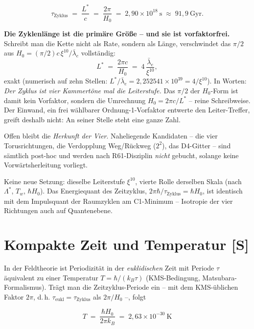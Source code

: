 \documentclass[11pt]{report}
\begin{document}
\begin{equation}
  \tau_\text{Zyklus} \;=\; \frac{L^{*}}{c}
  \;=\; \frac{2\pi}{H_0}
  \;=\; 2{,}90\times10^{18}~\text{s}
  \;\approx\; 91{,}9~\text{Gyr}.
  \label{eq:tauzyk}
\end{equation}

\textbf{Die Zyklenlänge ist die primäre Größe -- und sie ist
vorfaktorfrei.} Schreibt man die Kette nicht als Rate, sondern als
Länge, verschwindet das $\pi/2$ aus $H_0 = (\pi/2)c\,\xi^{10}/
\bar\lambda_e$ vollständig:
\begin{equation}
  L^{*} \;=\; \frac{2\pi c}{H_0}
  \;=\; 4\,\frac{\bar\lambda_e}{\xi^{10}},
  \label{eq:Lstar4}
\end{equation}
exakt (numerisch auf zehn Stellen: $L^{*}/\bar\lambda_e =
2{,}252541\times10^{39} = 4/\xi^{10}$). In Worten: \emph{Der Zyklus
ist vier Kammertöne mal die Leiterstufe.} Das $\pi/2$ der
$H_0$-Form ist damit kein Vorfaktor, sondern die Umrechnung
$H_0 = 2\pi c/L^{*}$ -- reine Schreibweise. Der Einwand, ein frei
wählbarer Ordnung-1-Vorfaktor entwerte den Leiter-Treffer, greift
deshalb nicht: An seiner Stelle steht eine ganze Zahl.

Offen bleibt die \emph{Herkunft der Vier}. Naheliegende
Kandidaten -- die vier Torusrichtungen, die Verdopplung
Weg/Rückweg ($2^2$), das D4-Gitter -- sind sämtlich post-hoc und
werden nach R61-Disziplin \emph{nicht} gebucht, solange keine
Vorwärtsherleitung vorliegt.

Keine neue Setzung: dieselbe Leiterstufe $\xi^{10}$, vierte Rolle
derselben Skala (nach $\Lambda^{*}$, $T_w$, $\hbar H_0$). Das
Energiequant des Zeitzyklus, $2\pi\hbar/\tau_\text{Zyklus}
= \hbar H_0$, ist identisch mit dem Impulsquant der Raumzyklen am
C1-Minimum -- Isotropie der vier Richtungen auch auf Quantenebene.

\section{Kompakte Zeit und Temperatur [S]}

In der Feldtheorie ist Periodizität in der \emph{euklidischen} Zeit
mit Periode $\tau$ äquivalent zu einer Temperatur
$T = \hbar/(k_B\tau)$ (KMS-Bedingung, Matsubara-Formalismus). Trägt
man die Zeitzyklus-Periode ein -- mit dem KMS-üblichen Faktor
$2\pi$, d.\,h. $\tau_\text{eukl} = \tau_\text{Zyklus}$ als
$2\pi/H_0$ --, folgt

\begin{equation}
  \boxed{\;T \;=\; \frac{\hbar H_0}{2\pi k_B}
  \;=\; 2{,}63\times10^{-30}~\text{K}\;}
  \label{eq:tgh}
\end{equation}
\end{document}
